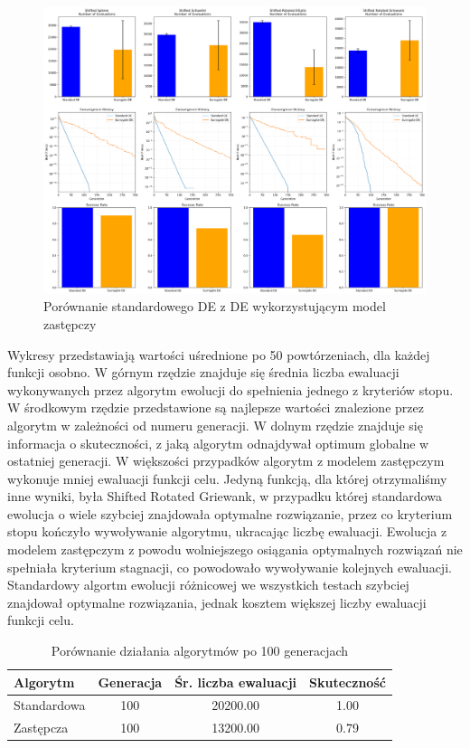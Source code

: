 \documentclass{article}
\begin{document}
\begin{figure}[H]
    \centering
    \includegraphics[width=\textwidth]{comprehensive_results.png}
    \caption{Porównanie standardowego DE z DE wykorzystującym model zastępczy}
    \label{fig:comprehensive_results}
\end{figure}

Wykresy przedstawiają wartości uśrednione po 50 powtórzeniach, dla każdej funkcji osobno. W górnym rzędzie znajduje się średnia liczba ewaluacji wykonywanych przez algorytm ewolucji do spełnienia jednego z kryteriów stopu. W środkowym rzędzie przedstawione są najlepsze wartości znalezione przez algorytm w zależności od numeru generacji. W dolnym rzędzie znajduje się informacja o skuteczności, z jaką algorytm odnajdywał optimum globalne w ostatniej generacji. 
W większości przypadków algorytm z modelem zastępczym wykonuje mniej ewaluacji funkcji celu. Jedyną funkcją, dla której otrzymaliśmy inne wyniki, była Shifted Rotated Griewank, w przypadku której standardowa ewolucja o wiele szybciej znajdowała optymalne rozwiązanie, przez co kryterium stopu kończyło wywoływanie algorytmu, ukracając liczbę ewaluacji. Ewolucja z modelem zastępczym z powodu wolniejszego osiągania optymalnych rozwiązań nie spełniała kryterium stagnacji, co powodowało wywoływanie kolejnych ewaluacji. 
Standardowy algortm ewolucji różnicowej we wszystkich testach szybciej znajdował optymalne rozwiązania, jednak kosztem większej liczby ewaluacji funkcji celu.

\begin{table}[h]
    \centering
    \begin{tabular}{|l|c|c|c|}
        \hline
        Algorytm & Generacja & Śr. liczba ewaluacji & Skuteczność \\
        \hline
        Standardowa & 100 & 20200.00 & 1.00 \\
        Zastępcza & 100 & 13200.00 & 0.79 \\
        \hline
    \end{tabular}
    \caption{Porównanie działania algorytmów po 100 generacjach}
    \label{tab:de_comparison}
\end{table}
\end{document}
